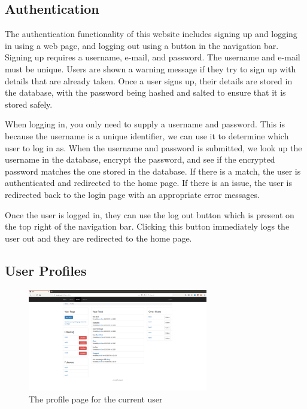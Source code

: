 \subsection{Authentication}

The authentication functionality of this website includes signing up and
logging in using a web page, and logging out using a button in the navigation
bar. Signing up requires
a username, e-mail, and password. The username and e-mail must be unique.
Users are shown a warning message if they try to sign up with details that
are already taken. Once a user signs up, their details are stored in the
database, with the password being hashed and salted to ensure that it is
stored safely.

When logging in, you only need to supply a username and password.
This is because the username is a unique
identifier, we can use it to determine which user to log in as. When the username
and password is submitted, we look up the username in the database, encrypt the
password, and see if the encrypted password matches the one stored in the database. 
If there is a match, the user is authenticated and redirected to the home page. 
If there is an issue, the user is redirected back to the login page with an 
appropriate error messages.

Once the user is logged in, they can use the log out button which is present
on the top right of the navigation bar. Clicking this button immediately logs
the user out and they are redirected to the home page.

\subsection{User Profiles}

\begin{figure}[H]
	\centering
	\includegraphics[width=0.7\textwidth]{final_report/pics/profile.png}
	\caption{The profile page for the current user}
	\label{fig:wireProfile}
\end{figure}

